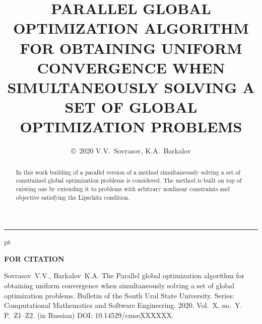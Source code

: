 \documentclass{cmi}
\begin{document}

{\phantom{eee} \hrule {} pt}
\classify{} %

\title{\uppercase{Parallel global optimization algorithm for obtaining uniform convergence
when simultaneously solving a set of global optimization problems}}

\author{\copyright~2020 V.V.~Sovrasov, K.A.~Barkalov}

\address{$^{1}$South Ural University (pr. Lenina 76, Chelyabinsk, 454080 Russia),\\$^{2}$Lomonosov Moscow State Universisty (GSP-1, Leninskie Gory 1, Moscow, 119991 Russia)}



\maketitle{}

\begin{abstract}%
  In this work building of a parallel version of a method simultaneously solving a set of
  constrained global optimization problems is considered. The method is built on top of existing
  one by extending it to problems with arbitrary nonlinear constraints and objective
  satisfying the Lipschitz condition.

\end{abstract}

\begin{flushleft}
  \textbf{FOR CITATION}
\end{flushleft}
\justifying

\begin{citationplace}
Sovrasov~V.V., Barkalov~K.A. The \LaTeXe{} Parallel global optimization algorithm for obtaining uniform convergence
when simultaneously solving a set of global optimization problems. Bulletin of the South Ural State University. Series: Computational Mathematics and Software Engineering. 2020. Vol.~X, no.~Y. P.~Z1--Z2. (in Russian) DOI: 10.14529/cmseXXXXXX.
\end{citationplace}
\end{document}
